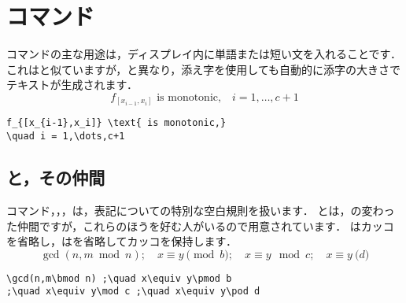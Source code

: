 
\section{コマンド}

コマンドの主な用途は，ディスプレイ内に単語または短い文を入れることです． 
これはと似ていますが，と異なり，添え字を使用しても自動的に添字の大きさでテキストが生成されます．
\begin{equation}
f_{[x_{i-1},x_i]} \text{ is monotonic,}
\quad i = 1,\dots,c+1
\end{equation}
\begin{verbatim}
f_{[x_{i-1},x_i]} \text{ is monotonic,}
\quad i = 1,\dots,c+1
\end{verbatim}

\subsection{ と，その仲間}

コマンド，，，は，表記についての特別な空白規則を扱います．
とは，の変わった仲間ですが，これらのほうを好む人がいるので用意されています．
はカッコを省略し，はを省略してカッコを保持します．
\begin{equation}
\gcd(n,m\bmod n) ;\quad x\equiv y\pmod b
;\quad x\equiv y\mod c ;\quad x\equiv y\pod d
\end{equation}
\begin{verbatim}
\gcd(n,m\bmod n) ;\quad x\equiv y\pmod b
;\quad x\equiv y\mod c ;\quad x\equiv y\pod d
\end{verbatim}

